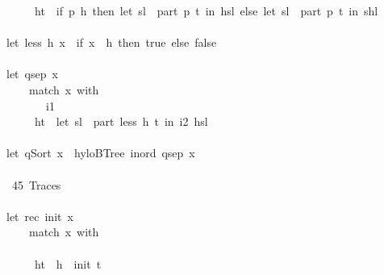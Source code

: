 \documentclass[a4paper]{article}
\begin{document}
\begin{tabbing}
\ttfamily ~~~~~~ht~~if~p~h~then~let~sl~~part~p~t~in~hsl~else~let~sl~~part~p~t~in~shl\\
\ttfamily ~\\
\ttfamily ~let~less~h~x~~if~x~~h~then~true~else~false\\
\ttfamily ~\\
\ttfamily ~let~qsep~x~\\
\ttfamily ~~~~~match~x~with\\
\ttfamily ~~~~~~~~i1\\
\ttfamily ~~~~~~ht~~let~sl~~part~less~h~t~in~i2~hsl\\
\ttfamily ~\\
\ttfamily ~let~qSort~x~~hyloBTree~inord~qsep~x\\
\ttfamily ~\\
\ttfamily ~~45~Traces~\\
\ttfamily ~\\
\ttfamily ~let~rec~init~x~\\
\ttfamily ~~~~~match~x~with\\
\ttfamily ~~~~~~~~\\
\ttfamily ~~~~~~ht~~h~~init~t\\

\end{tabbing}
\end{document}
